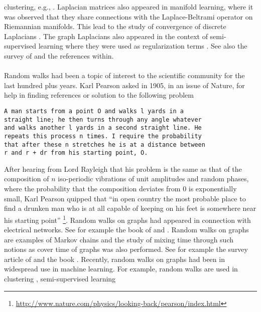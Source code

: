 clustering, e.g.,
\citet{scott90:_featur,shi00:_normal,ng02,weiss9:_segmen}. Laplacian matrices
also appeared in manifold learning, where it was observed that they
share connections with the Laplace-Beltrami operator on Riemannian
manifolds. This lead to the study of convergence of discrete
Laplacians
\citep{hein05:_from,luxburg08:_consis,belkin08:_towar_theor_found_laplac,
  hein07:_conver_laplac,coifman06:_diffus_maps}. The graph Laplacians
also appeared in the context of semi-supervised learning where they
were used as regularization terms
\citep{zhu03:_semi_super_learn_using_gauss,belkin06:_manif_regul}. See
also the survey of \citet{zhu05:_semi_super} and the references
within. \\ \\
%
\noindent
Random walks had been a topic of interest to the scientific community
for the last hundred plus years. Karl Pearson asked in
1905, in an issue of
Nature, for help in finding references or solution to the following
problem
\begin{verbatim}
A man starts from a point O and walks l yards in a
straight line; he then turns through any angle whatever 
and walks another l yards in a second straight line. He 
repeats this process n times. I require the probability 
that after these n stretches he is at a distance between
r and r + dr from his starting point, O.
\end{verbatim}
After hearing from Lord Rayleigh that his problem is the same as that
of the composition of $n$ iso-periodic vibrations of unit amplitudes
and random phases, where the probability that the composition deviates
from $0$ is exponentially small, Karl Pearson quipped that ``in open
country the most probable place to find a drunken man who is at all
capable of keeping on his feet is somewhere near his starting point''
\footnote{\url{http://www.nature.com/physics/looking-back/pearson/index.html}}.
Random walks on graphs had appeared in connection with electrical
networks. See for example the book of
\citet{doyle84:_random_walks_elect_networ} and
\citet{lyons:_probab_trees_networ}. Random walks on graphs are
examples of Markov chains and the study of mixing time through such
notions as cover time of graphs was also performed. See for example
the survey article of \citet{lovasz96:_random_graph} and the book
\citet{levin09:_markov_chain_mixin_times}. Recently, random walks on
graphs had been in widespread use in machine learning. For example,
random walks are used in clustering
\citep{saerens04,yen07:_graph,qui07:_clust}, semi-supervised learning
